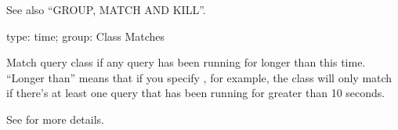 \documentclass[letterpaper,10pt,english]{sphinxmanual}
\begin{document}
See also “GROUP, MATCH AND KILL”.

\begin{fulllineitems}
\label{\detokenize{mariadb-kill:cmdoption-mariadb-kill-any-busy-time}}
type: time; group: Class Matches

Match query class if any query has been running for longer than this time.
“Longer than” means that if you specify , for example, the class will
only match if there’s at least one query that has been running for greater
than 10 seconds.

See {\hyperref[\detokenize{mariadb-kill:cmdoption-mariadb-kill-each-busy-time}]{}} for more details.

\end{fulllineitems}

\end{document}
